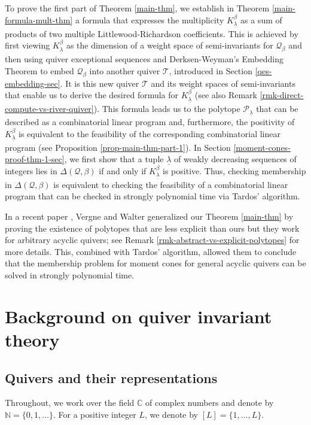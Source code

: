 \documentclass[11pt]{article}
\theoremstyle{definition}
\numberwithin{equation}{section}
\newcommand{\p}{\mathcal{P}}
\newcommand{\CC}{\mathbb C}
\newcommand{\NN}{\mathbb N}
\newcommand{\Q}{\mathbf{\mathcal{Q}}}
\newcommand{\unlm}{\underline{\lambda}}
\newcommand{\river}{\mathcal{T}}
\begin{document}
To prove the first part of Theorem \ref{main-thm}, we establish in Theorem \ref{main-formula-mult-thm} a formula that expresses the multiplicity $K^{\beta}_{\unlm}$ as a sum of products of two multiple Littlewood-Richardson coefficients. This is achieved by first viewing $K^{\beta}_{\unlm}$ as the dimension of a weight space of semi-invariants for $\Q_\beta$ and then using quiver exceptional sequences and Derksen-Weyman's Embedding Theorem to embed $\Q_\beta$ into another quiver $\river$, introduced in Section \ref{qes-embedding-sec}. It is this new quiver $\river$ and its weight spaces of semi-invariants that enable us to derive the desired formula for $K^{\beta}_{\unlm}$ (see also Remark \ref{rmk-direct-compute-vs-river-quiver}). This formula leads us to the polytope $\p_{\unlm}$ that can be described as a combinatorial linear program and, furthermore, the positivity of $K^{\beta}_{\unlm}$ is equivalent to the feasibility of the corresponding combinatorial linear program (see Proposition \ref{prop-main-thm-part-1}). In Section \ref{moment-cones-proof-thm-1-sec}, we first show that a tuple $\underline{\lambda}$ of weakly decreasing sequences of integers lies in $\Delta(\Q, \beta)$ if and only if $K^{\beta}_{\unlm}$ is positive. Thus, checking membership in $\Delta(\Q, \beta)$ is equivalent to checking the feasibility of a combinatorial linear program that can be checked in strongly polynomial time via Tardos' algorithm.

In a recent paper \cite{Ver-Wal-2023}, Vergne and Walter generalized our Theorem \ref{main-thm} by proving the existence of polytopes that are less explicit than ours but they work for arbitrary acyclic quivers; see Remark \ref{rmk-abstract-vs-explicit-polytopes} for more details. This, combined with Tardos' algorithm, allowed them to conclude that the membership problem for moment cones for general acyclic quivers can be solved in strongly polynomial time. 

\section{Background on quiver invariant theory}\label{QIT-semi-invariants-sec}

\subsection{Quivers and their representations} Throughout, we work over the field $\CC$ of complex numbers and denote by $\NN=\{0,1,\dots \}$. For a positive integer $L$, we denote by $[L]=\{1, \ldots, L\}$.
\end{document}

